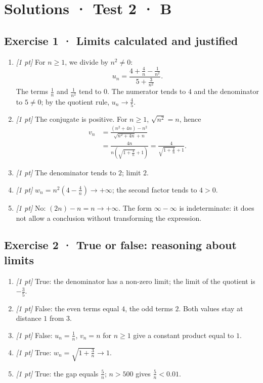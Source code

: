 \ifmxteacher\mxnewpage

\section*{Solutions · Test 2 · B}\label{cor:2-4}

\subsection*{Exercise 1 · Limits calculated and justified}\begin{enumerate}

\item \textit{[1 pt]} For $n\ge1$, we divide by $n^2\ne0$:
\[u_n=\frac{4+\frac{4}{n}-\frac{1}{n^2}}{5+\frac{3}{n^2}}.\]
The terms $\frac{1}{n}$ and $\frac{1}{n^2}$ tend to $0$. The numerator tends to $4$ and the denominator to $5\ne0$; by the quotient rule, $u_n\to\frac{4}{5}$.

\item \textit{[1 pt]} The conjugate is positive. For $n\ge1$, $\sqrt{n^2}=n$, hence
\[\begin{aligned}v_n&=\frac{(n^2+4n)-n^2}{\sqrt{n^2+4n}+n}\\&=\frac{4n}{n(\sqrt{1+\frac{4}{n}}+1)}=\frac{4}{\sqrt{1+\frac{4}{n}}+1}.\end{aligned}\]

\item \textit{[1 pt]} The denominator tends to $2$; limit $2$.

\item \textit{[1 pt]} $w_n=n^2(4-\frac{4}{n})\to+\infty$; the second factor tends to $4>0$.

\item \textit{[1 pt]} No: $(2n)-n=n\to+\infty$. The form $\infty-\infty$ is indeterminate: it does not allow a conclusion without transforming the expression.

\end{enumerate}

\subsection*{Exercise 2 · True or false: reasoning about limits}\begin{enumerate}

\item \textit{[1 pt]} True: the denominator has a non-zero limit; the limit of the quotient is $-\frac{3}{5}$.

\item \textit{[1 pt]} False: the even terms equal $4$, the odd terms $2$. Both values stay at distance $1$ from $3$.

\item \textit{[1 pt]} False: $u_n=\frac{1}{n}$, $v_n=n$ for $n\ge1$ give a constant product equal to $1$.

\item \textit{[1 pt]} True: $w_n=\sqrt{1+\frac{3}{n}}\to1$.

\item \textit{[1 pt]} True: the gap equals $\frac{5}{n}$; $n>500$ gives $\frac{5}{n}<\num{0,01}$.

\end{enumerate}

